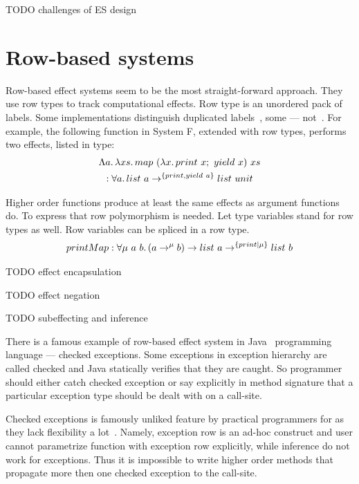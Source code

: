 \documentclass[conference]{IEEEtran}
\newcommand{\seq}{;~}
\newcommand{\ap}{~}
\begin{document}
    TODO challenges of ES design %


    \section{Row-based systems}

    Row-based effect systems seem to be the most straight-forward approach.
    They use row types to track computational effects.
    Row type is an unordered pack of labels.
    Some implementations distinguish duplicated labels~\cite{koka}, some --- not~\cite{links}.
    For example, the following function in System F, extended with row types, performs two effects, listed in type:
    \begin{multline*}
        \Lambda a\ldotp\lambda xs\ldotp map \ap (\lambda x\ldotp print\ap x\seq yield\ap x) \ap xs \\ : \forall a \ldotp list\ap a \to^{\{print, yield \ap a\}} list \ap unit
    \end{multline*}

    Higher order functions produce at least the same effects as argument functions do.
    To express that row polymorphism is needed.
    Let type variables stand for row types as well.
    Row variables can be spliced in a row type.
    \begin{multline*}
        printMap : \forall \mu \ap a \ap b\ldotp (a \to^\mu b) \to list \ap a \to^{\{print|\mu\}} list \ap b
    \end{multline*}


    TODO effect encapsulation %

    TODO effect negation %

    TODO subeffecting and inference %

    There is a famous example of row-based effect system in Java~\cite{java} programming language --- checked exceptions.
    Some exceptions in exception hierarchy are called checked and Java statically verifies that they are caught.
    So programmer should either catch checked exception or say explicitly in method signature that a particular exception type should be dealt with on a call-site.

    Checked exceptions is famously unliked feature by practical programmers for as they lack flexibility a lot~\cite{checked-exceptions}.
    Namely, exception row is an ad-hoc construct and user cannot parametrize function with exception row explicitly, while inference do not work for exceptions.
    Thus it is impossible to write higher order methods that propagate more then one checked exception to the call-site.
\end{document}
